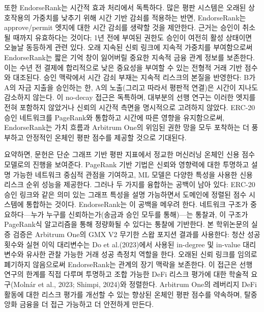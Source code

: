 또한 EndorseRank는 시간적 효과 처리에서 독특하다. 많은 평판 시스템은 오래된 상호작용의 가중치를 낮추기 위해 시간 기반 감쇠를 적용하는 반면, EndorseRank는 approve/permit 엣지에 대한 시간 감쇠를 생략할 것을 제안한다. 근거는 승인이 취소될 때까지 유효하다는 것이다; 1년 전에 부여된 권한도 승인이 여전히 활성 상태이면 오늘날 동등하게 관련 있다. 오래 지속된 신뢰 링크에 지속적 가중치를 부여함으로써 EndorseRank는 짧은 기억 창이 잃어버릴 중요한 지속적 금융 관계 정보를 보존한다. 이는 수년 전 결제에 합리적으로 낮은 중요성을 부여할 수 있는 전형적 거래 기반 점수와 대조된다. 승인 맥락에서 시간 감쇠 부재는 지속적 리스크의 본질을 반영한다: B가 A의 자금 지출을 승인하는 한, A의 노출(그리고 따라서 평판적 연결)은 시간이 지나도 감소하지 않는다. 이 no-decay 접근은 독특하며, 대부분의 선행 연구는 이러한 엣지를 전혀 포함하지 않았거나 신뢰의 시간적 측면을 명시적으로 고려하지 않았다. ERC-20 승인 네트워크를 PageRank와 통합하고 시간에 따른 영향을 유지함으로써, EndorseRank는 가치 흐름과 Arbitrum One의 위임된 권한 망을 모두 포착하는 더 풍부하고 안정적인 온체인 평판 점수를 제공할 것으로 기대된다.


요약하면, 문헌은 단순 그래프 기반 평판 지표에서 정교한 머신러닝 온체인 신용 점수 모델로의 진행을 보여준다. PageRank 기반 기법은 신뢰와 영향력에 대한 투명하고 설명 가능한 네트워크 중심적 관점을 기여하고, ML 모델은 다양한 특성을 사용한 신용 리스크 순위 성능을 제공한다. 그러나 두 가지를 융합하는 공백이 남아 있다: ERC-20 승인 링크와 같은 의미 있는 그래프 특성을 설명 가능하면서 도메인에 정렬된 점수 시스템에 통합하는 것이다. EndorseRank는 이 공백을 메우려 한다. 네트워크 구조가 중요하다---누가 누구를 신뢰하는가(송금과 승인 모두를 통해)---는 통찰과, 이 구조가 PageRank식 알고리즘을 통해 정량화될 수 있다는 통찰에 기반한다. 본 학위논문의 실증 검증은 Arbitrum One의 GMX V2 무기한 스왑 포지션 결과를 사용한다: 청산 성공 횟수와 실현 이익 대리변수는 Do et al.(2023)에서 사용된 in-degree 및 in-value 대리변수와 유사한 관찰 가능한 거래 성공 측정치 역할을 한다. 오래된 신뢰 링크를 임의로 폐기하지 않음으로써 EndorseRank는 관계의 장기 맥락을 보존한다. 이 접근은 선행 연구의 한계를 직접 다루며 투명하고 조합 가능한 DeFi 리스크 평가에 대한 학술적 요구(Moln\'{a}r et al., 2023; Shimpi, 2024)와 정렬한다. Arbitrum One의 레버리지 DeFi 활동에 대한 리스크 평가를 개선할 수 있는 향상된 온체인 평판 점수를 약속하며, 탈중앙화 금융을 더 접근 가능하고 더 안전하게 만든다.
